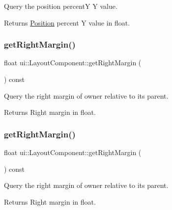 Query the position percentY Y value. \begin{DoxyReturn}{Returns}
\hyperlink{structPosition}{Position} percent Y value in float. 
\end{DoxyReturn}
\mbox{\label{classui_1_1LayoutComponent_a298c916ad2bba6bb4720574388a9938d}} 
\subsubsection{\texorpdfstring{get\+Right\+Margin()}{getRightMargin()}\hspace{0.1cm}{\footnotesize\ttfamily [1/2]}}
{\footnotesize\ttfamily float ui\+::\+Layout\+Component\+::get\+Right\+Margin (\begin{DoxyParamCaption}{ }\end{DoxyParamCaption}) const}

Query the right margin of owner relative to its parent. \begin{DoxyReturn}{Returns}
Right margin in float. 
\end{DoxyReturn}
\mbox{\label{classui_1_1LayoutComponent_a298c916ad2bba6bb4720574388a9938d}} 
\subsubsection{\texorpdfstring{get\+Right\+Margin()}{getRightMargin()}\hspace{0.1cm}{\footnotesize\ttfamily [2/2]}}
{\footnotesize\ttfamily float ui\+::\+Layout\+Component\+::get\+Right\+Margin (\begin{DoxyParamCaption}{ }\end{DoxyParamCaption}) const}

Query the right margin of owner relative to its parent. \begin{DoxyReturn}{Returns}
Right margin in float. 
\end{DoxyReturn}
\mbox{\label{classui_1_1LayoutComponent_ad363e4da99754e0cd4ea18219a8bd4a9}} 
